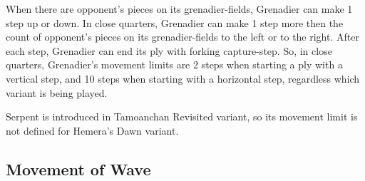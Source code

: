 When there are opponent's pieces on its grenadier-fields, Grenadier can make 1
step up or down. In close quarters, Grenadier can make 1 step more then the count
of opponent's pieces on its grenadier-fields to the left or to the right. After
each step, Grenadier can end its ply with forking capture-step. \newline
\indent
So, in close quarters, Grenadier's movement limits are 2 steps when starting
a ply with a vertical step, and 10 steps when starting with a horizontal step,
regardless which variant is being played.

Serpent is introduced in Tamoanchan Revisited variant, so its movement limit is
not defined for Hemera's Dawn variant.

\clearpage %

\subsection*{Movement of Wave}
\label{sec:Appendix/Movement of Wave}

